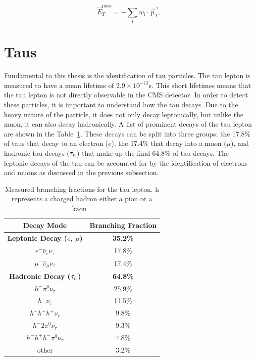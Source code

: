 \begin{equation}
\vec{E}_{T}^{\text{miss}} = - \sum_{i} w_{i} \cdot \vec{p}_{T}^{\hspace{4pt}i}.
\end{equation}

\section{Taus}
\label{sec:taus}

Fundamental to this thesis is the identification of tau particles.
The tau lepton is measured to have a mean lifetime of \(2.9 \times 10^{-13}\)s. 
This short lifetimes means that the tau lepton is not directly observable in the \ac{CMS} detector.  
In order to detect these particles, it is important to understand how the tau decays. 
Due to the heavy nature of the particle, it does not only decay leptonically, but unlike the muon, it can also decay hadronically.
A list of prominent decays of the tau lepton are shown in the Table~\ref{tab:tau_decay}.
These decays can be split into three groups: the 17.8\% of taus that decay to an electron ($e$), the 17.4\% that decay into a muon ($\mu$), and hadronic tau decays ($\tau_{h}$) that make up the final 64.8\% of tau decays. 
The leptonic decays of the tau can be accounted for by the identification of electrons and muons as discussed in the previous subsection.  \\

\begin{table}[h]
    \centering
    \begin{tabular}{|c|c|}
         \hline
         Decay Mode & Branching Fraction  \\
         \hline
         \hline
         \textbf{Leptonic Decay ($e$, $\mu$)} & \textbf{35.2\%} \\
         $e^- \bar{\nu}_e \nu_\tau $ & 17.8\% \\
         $\mu^- \bar{\nu}_\mu \nu_\tau $ & 17.4\% \\
         \hline
         \textbf{Hadronic Decay ($\tau_{h}$)} & \textbf{64.8\%} \\
         $h^- \pi^0 \nu_\tau $ & 25.9\% \\
         $h^- \nu_\tau$ & 11.5\% \\
         $h^- h^+ h^+ \nu_\tau$ & 9.8\% \\
         $h^- 2\pi^0 \nu_\tau$ & 9.3\% \\
         $h^- h^+ h^- \pi^0 \nu_\tau$ & 4.8\% \\
         other & 3.2\% \\
         \hline
    \end{tabular}
    \caption{Measured branching fractions for the tau lepton. h represents a charged hadron either a pion or a kaon~\cite{ParticleDataGroup:2022pth}.}
    \label{tab:tau_decay}
\end{table}

